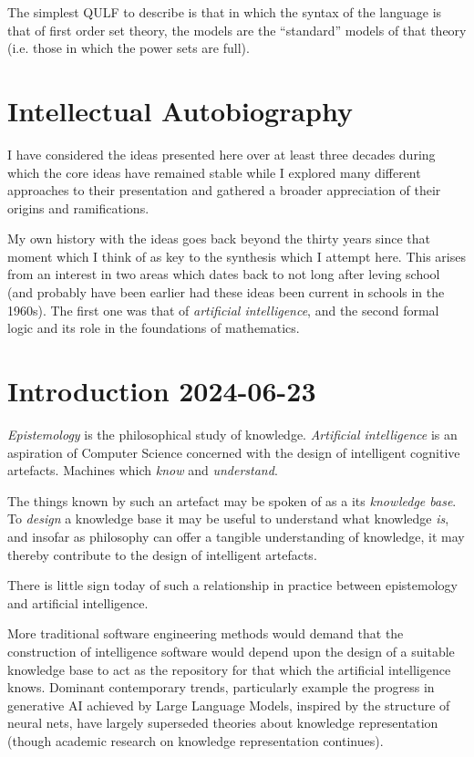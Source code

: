 \documentclass[10pt,titlepage]{book}
\begin{document}
The simplest QULF to describe is that in which the syntax of the language is that of first order set theory, the models are the ``standard'' models of that theory (i.e. those in which the power sets are full).


\chapter{Intellectual Autobiography}

I have considered the ideas presented here over at least three decades during which the core ideas have remained stable while I explored many different approaches to their presentation and gathered a broader appreciation of their origins and ramifications.

My own history with the ideas goes back beyond the thirty years since that moment which I think of as key to the synthesis which I attempt here.
This arises from an interest in two areas which dates back to not long after leving school (and probably have been earlier had these ideas been current in schools in the 1960s).
The first one was that of \emph{artificial intelligence}, and the second formal logic and its role in the foundations of mathematics.

\appendix
\chapter{Introduction 2024-06-23}

\emph{Epistemology} is the philosophical study of knowledge.
\emph{Artificial intelligence} is an aspiration of Computer Science concerned with the design of intelligent cognitive artefacts.
Machines which \emph{know} and \emph{understand}.

The things known by such an artefact may be spoken of as a its \emph{knowledge base}.
To \emph{design} a knowledge base it may be useful to understand what knowledge \emph{is}, and insofar as philosophy can offer a tangible understanding of knowledge, it may thereby contribute to the design of intelligent artefacts.

There is little sign today of such a relationship in practice between epistemology and artificial intelligence.




More traditional software engineering methods would demand that the construction of intelligence software would depend upon the design of a suitable knowledge base to act as the repository for that which the artificial intelligence knows.
Dominant contemporary trends, particularly example the progress in generative AI achieved by Large Language Models, inspired by the structure of neural nets, have largely superseded theories about knowledge representation (though academic research on knowledge representation continues).
\end{document}
